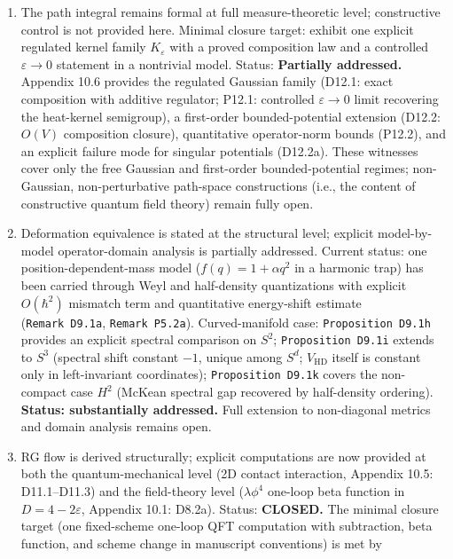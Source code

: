 \documentclass[
]{article}
\providecommand{\tightlist}{%
  \setlength{\itemsep}{0pt}\setlength{\parskip}{0pt}}
\begin{document}
\begin{enumerate}
\def\labelenumi{\arabic{enumi}.}
\tightlist
\item
  The path integral remains formal at full measure-theoretic level;
  constructive control is not provided here. Minimal closure target:
  exhibit one explicit regulated kernel family \(K_\varepsilon\) with a
  proved composition law and a controlled \(\varepsilon\to0\) statement
  in a nontrivial model. Status: \textbf{Partially addressed.} Appendix
  10.6 provides the regulated Gaussian family (D12.1: exact composition
  with additive regulator; P12.1: controlled \(\varepsilon\to0\) limit
  recovering the heat-kernel semigroup), a first-order bounded-potential
  extension (D12.2: \(O(V)\) composition closure), quantitative
  operator-norm bounds (P12.2), and an explicit failure mode for
  singular potentials (D12.2a). These witnesses cover only the free
  Gaussian and first-order bounded-potential regimes; non-Gaussian,
  non-perturbative path-space constructions (i.e., the content of
  constructive quantum field theory) remain fully open.
\item
  Deformation equivalence is stated at the structural level; explicit
  model-by-model operator-domain analysis is partially addressed.
  Current status: one position-dependent-mass model
  (\(f(q)=1+\alpha q^2\) in a harmonic trap) has been carried through
  Weyl and half-density quantizations with explicit \(O(\hbar^2)\)
  mismatch term and quantitative energy-shift estimate
  (\texttt{Remark\ D9.1a}, \texttt{Remark\ P5.2a}). Curved-manifold
  case: \texttt{Proposition\ D9.1h} provides an explicit spectral
  comparison on \(S^2\); \texttt{Proposition\ D9.1i} extends to \(S^3\)
  (spectral shift constant \(-1\), unique among \(S^d\);
  \(V_{\mathrm{HD}}\) itself is constant only in left-invariant
  coordinates); \texttt{Proposition\ D9.1k} covers the non-compact case
  \(H^2\) (McKean spectral gap recovered by half-density ordering).
  \textbf{Status: substantially addressed.} Full extension to
  non-diagonal metrics and domain analysis remains open.
\item
  RG flow is derived structurally; explicit computations are now
  provided at both the quantum-mechanical level (2D contact interaction,
  Appendix 10.5: D11.1--D11.3) and the field-theory level
  (\(\lambda\phi^4\) one-loop beta function in \(D=4-2\varepsilon\),
  Appendix 10.1: D8.2a). Status: \textbf{CLOSED.} The minimal closure
  target (one fixed-scheme one-loop QFT computation with subtraction,
  beta function, and scheme change in manuscript conventions) is met by

\end{enumerate}
\end{document}

